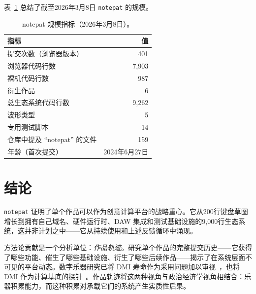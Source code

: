 \documentclass[10pt,letterpaper,twocolumn]{article}
\begin{document}
表~\ref{tab:scale} 总结了截至2026年3月8日 \texttt{notepat} 的规模。

\begin{table}[h]
\small
\centering
\begin{tabularx}{\columnwidth}{l r}
\toprule
\textbf{指标} & \textbf{值} \\
\midrule
提交次数（浏览器版本） & 401 \\
浏览器代码行数 & 7{,}903 \\
裸机代码行数 & 987 \\
衍生作品 & 6 \\
总生态系统代码行数 & 9{,}262 \\
波形类型 & 5 \\
专用测试脚本 & 14 \\
仓库中提及 ``notepat'' 的文件 & 159 \\
年龄（首次提交） & 2024年6月27日 \\
\bottomrule
\end{tabularx}
\caption{notepat 规模指标（2026年3月8日）。}
\label{tab:scale}
\end{table}

\section{结论}

\texttt{notepat} 证明了单个作品可以作为创意计算平台的战略重心。它从200行键盘草图增长到拥有自己域名、硬件运行时、DAW 集成和测试基础设施的9,000行生态系统，这并非计划之中——它从持续使用和上述反馈循环中涌现。

方法论贡献是一个分析单位：\emph{作品轨迹}。研究单个作品的完整提交历史——它获得了哪些功能、催生了哪些基础设施、衍生了哪些后续作品——揭示了在系统层面不可见的平台动态。数字乐器研究已将 DMI 寿命作为采用问题加以审视~\citep{marquez2018dmi}，也将 DMI 作为计算基底的探针~\citep{tahiroglu2020probes}。作品轨迹将这两种视角与政治经济学视角相结合：乐器积累能力，而这种积累对承载它们的系统产生实质性后果。



\end{document}
